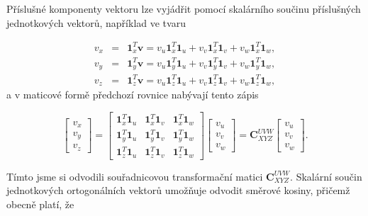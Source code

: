Příslušné komponenty vektoru lze vyjádřit pomocí skalárního součinu příslušných jednotkových vektorů, například ve tvaru

\begin{eqnarray}
v_{x} &=& \mathbf{1}^{T}_{x}\mathbf{v} = v_{u}\mathbf{1}^{T}_{x}\mathbf{1}_{u} + v_{v}\mathbf{1}^{T}_{x}\mathbf{1}_{v} + v_{w}\mathbf{1}^{T}_{x}\mathbf{1}_{w}, \\
v_{y} &=& \mathbf{1}^{T}_{y}\mathbf{v} = v_{u}\mathbf{1}^{T}_{y}\mathbf{1}_{u} + v_{v}\mathbf{1}^{T}_{y}\mathbf{1}_{v} + v_{w}\mathbf{1}^{T}_{y}\mathbf{1}_{w}, \\
v_{z} &=& \mathbf{1}^{T}_{z}\mathbf{v} = v_{u}\mathbf{1}^{T}_{z}\mathbf{1}_{u} + v_{v}\mathbf{1}^{T}_{z}\mathbf{1}_{v} + v_{w}\mathbf{1}^{T}_{z}\mathbf{1}_{w},
\end{eqnarray}
a v maticové formě předchozí rovnice nabývají tento zápis

\begin{equation}
\begin{bmatrix}
v_{x} \\
v_{y} \\
v_{z}
\end{bmatrix} =
\begin{bmatrix}
\mathbf{1}_{x}^{T}\mathbf{1}_{u} & \mathbf{1}_{x}^{T}\mathbf{1}_{v} & \mathbf{1}_{x}^{T}\mathbf{1}_{w} \\
\mathbf{1}_{y}^{T}\mathbf{1}_{u} & \mathbf{1}_{y}^{T}\mathbf{1}_{v} & \mathbf{1}_{y}^{T}\mathbf{1}_{w} \\
\mathbf{1}_{z}^{T}\mathbf{1}_{u} & \mathbf{1}_{z}^{T}\mathbf{1}_{v} & \mathbf{1}_{z}^{T}\mathbf{1}_{w} 
\end{bmatrix} 
\begin{bmatrix}
v_{u} \\
v_{v} \\
v_{w}
\end{bmatrix} = \mathbf{C}^{UVW}_{XYZ}
\begin{bmatrix}
v_{u} \\
v_{v} \\
v_{w}
\end{bmatrix}.
\label{rov:transGeneral}
\end{equation}

Tímto jsme si odvodili souřadnicovou transformační matici $\mathbf{C}_{XYZ}^{UVW}$. Skalární součin jednotkových ortogonálních vektorů umožňuje odvodit směrové kosiny, přičemž obecně platí, že

